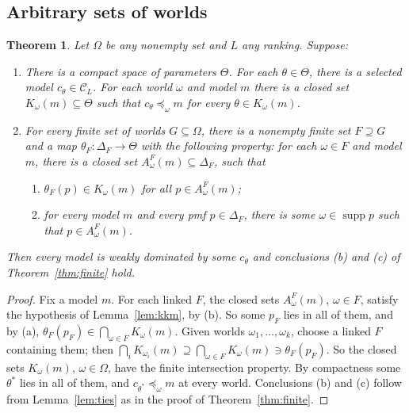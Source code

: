 \documentclass[11pt]{article}
\newtheorem{theorem}{Theorem}[section]
\theoremstyle{definition}
\newcommand{\C}{\mathcal C}
\newcommand{\supp}{\operatorname{supp}}
\begin{document}
\subsection{Arbitrary sets of worlds}

\begin{theorem}\label{thm:local}
Let $\Omega$ be any nonempty set and $L$ any ranking. Suppose:
\begin{enumerate}[label=\arabic*.,leftmargin=*]
\item There is a compact space of parameters $\Theta$. For each $\theta\in\Theta$, there is a selected model $c_\theta\in\C_L$. For each world $\omega$ and model $m$ there is a closed set $K_\omega(m)\subseteq\Theta$ such that $c_\theta\preceq_\omega m$ for every $\theta\in K_\omega(m)$.
\item For every finite set of worlds $G\subseteq\Omega$, there is a nonempty finite set $F\supseteq G$ and a map $\theta_F:\Delta_F\to\Theta$ with the following property: for each $\omega\in F$ and model $m$, there is a closed set $A^F_\omega(m)\subseteq\Delta_F$, such that
\begin{enumerate}[label=(\alph*)]
\item $\theta_F(p)\in K_\omega(m)$ for all $p\in A^F_\omega(m)$;
\item for every model $m$ and every pmf $p\in\Delta_F$, there is some $\omega\in\supp p$ such that $p\in A^F_\omega(m)$.
\end{enumerate}
\end{enumerate}
Then every model is weakly dominated by some $c_\theta$ and conclusions (b) and (c) of Theorem~\ref{thm:finite} hold.
\end{theorem}
\begin{proof}
Fix a model $m$. For each linked $F$, the closed sets $A^F_\omega(m)$, $\omega\in F$, satisfy the hypothesis of Lemma~\ref{lem:kkm}, by (b). So some $p_F$ lies in all of them, and by (a), $\theta_F(p_F)\in\bigcap_{\omega\in F}K_\omega(m)$. Given worlds $\omega_1,\dots,\omega_k$, choose a linked $F$ containing them; then $\bigcap_iK_{\omega_i}(m)\supseteq\bigcap_{\omega\in F}K_\omega(m)\ni\theta_F(p_F)$. So the closed sets $K_\omega(m)$, $\omega\in\Omega$, have the finite intersection property. By compactness some $\theta^*$ lies in all of them, and $c_{\theta^*}\preceq_\omega m$ at every world. Conclusions (b) and (c) follow from Lemma~\ref{lem:ties} as in the proof of Theorem~\ref{thm:finite}.
\end{proof}
\end{document}
